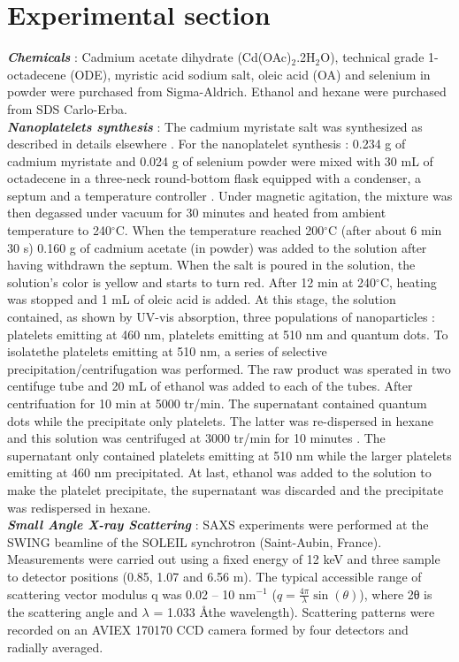 \documentclass[journal = jacsat, manuscript=article, layout = twocolumn]{achemso}
\begin{document}
\section{Experimental section}
\textbf{\textit{Chemicals}} : Cadmium acetate dihydrate (Cd(OAc)$_2$.2H$_2$O), technical grade 1-octadecene (ODE), myristic acid sodium salt, oleic acid (OA) and selenium in powder were purchased from Sigma-Aldrich. Ethanol and hexane were purchased from SDS Carlo-Erba.\\

\textbf{\textit{Nanoplatelets synthesis}} : The cadmium myristate salt was synthesized as described in details elsewhere \cite{Yang:2005kc}. For the nanoplatelet synthesis : 0.234 g of cadmium myristate and 0.024 g of selenium powder were mixed with 30 mL of octadecene in a three-neck round-bottom flask equipped with a condenser, a septum and a temperature controller . Under magnetic agitation, the mixture was then degassed under vacuum for 30 minutes and heated from ambient temperature to 240$^\circ$C. When the temperature reached 200$^\circ$C (after about 6 min 30 s) 0.160 g of cadmium acetate (in powder) was added to the solution after having withdrawn the septum. When the salt is poured in the solution, the solution's color is yellow and starts to turn red. After 12 min at 240$^\circ$C, heating was stopped and 1 mL of oleic acid is added. At this stage, the solution contained, as shown by UV-vis absorption, three populations of nanoparticles : platelets emitting at 460 nm, platelets emitting at 510 nm and quantum dots. To isolatethe platelets emitting at 510 nm, a series of selective precipitation/centrifugation was performed. The raw product was sperated in two centifuge tube and 20 mL of ethanol was added to each of the tubes. After centrifuation for 10 min at 5000 tr/min. The supernatant contained quantum dots while the precipitate only platelets. The latter was re-dispersed in hexane and this solution was centrifuged at 3000 tr/min for 10 minutes . The supernatant only contained platelets emitting at 510 nm while the larger platelets emitting at 460 nm precipitated. At last, ethanol was added to the solution to make the platelet precipitate, the supernatant was discarded and the precipitate was redispersed in hexane.\\

\textbf{\textit{Small Angle X-ray Scattering}} : SAXS experiments were performed at the SWING beamline of the SOLEIL synchrotron (Saint-Aubin, France). Measurements were carried out using a fixed energy of 12 keV and three sample to detector positions (0.85, 1.07 and 6.56 m). The typical accessible range of scattering vector modulus q was 0.02 – 10 nm$^{−1}$ ($q=\frac{4\pi}{\lambda} \sin(\theta)$), where 2θ is the scattering angle and $\lambda$ = 1.033 \AA  the wavelength). Scattering patterns were recorded on an AVIEX 170170 CCD camera formed by four detectors and radially averaged.\\
\end{document}
